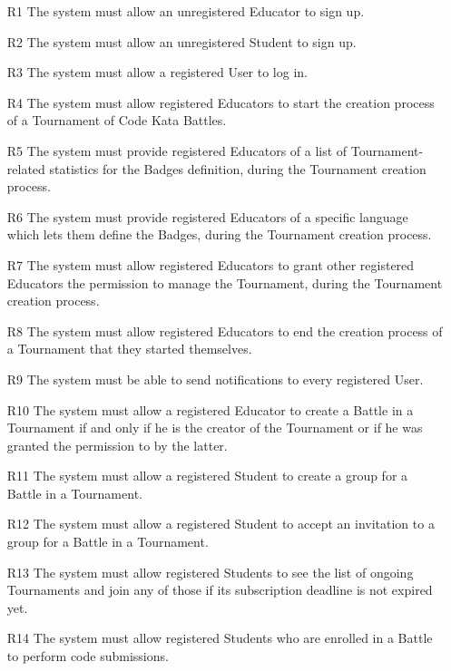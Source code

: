 \documentclass{Configuration_Files/Template}
\begin{document}
\begin{enumerate}
    \item[\textcolor{bluepoli}{R1}] The system must allow an unregistered Educator to sign up.
    \item[\textcolor{bluepoli}{R2}] The system must allow an unregistered Student to sign up.
    \item[\textcolor{bluepoli}{R3}] The system must allow a registered User to log in.
    \item[\textcolor{bluepoli}{R4}] The system must allow registered Educators to start the creation process of a Tournament of Code Kata Battles.
    \item[\textcolor{bluepoli}{R5}] The system must provide registered Educators of a list of Tournament-related statistics for the Badges definition, during the Tournament creation process.
    \item[\textcolor{bluepoli}{R6}] The system must provide registered Educators of a specific language which lets them define the Badges, during the Tournament creation process.
    \item[\textcolor{bluepoli}{R7}] The system must allow registered Educators to grant other registered Educators the permission to manage the Tournament, during the Tournament creation process.
    \item[\textcolor{bluepoli}{R8}] The system must allow registered Educators to end the creation process of a Tournament that they started themselves.
    \item[\textcolor{bluepoli}{R9}] The system must be able to send notifications to every registered User.
    \item[\textcolor{bluepoli}{R10}] The system must allow a registered Educator to create a Battle in a Tournament if and only if he is the creator of the Tournament or if he was granted the permission to by the latter.
    \item[\textcolor{bluepoli}{R11}] The system must allow a registered Student to create a group for a Battle in a Tournament.
    \item[\textcolor{bluepoli}{R12}] The system must allow a registered Student to accept an invitation to a group for a Battle in a Tournament.
    \item[\textcolor{bluepoli}{R13}] The system must allow registered Students to see the list of ongoing Tournaments and join any of those if its subscription deadline is not expired yet.
    \item[\textcolor{bluepoli}{R14}] The system must allow registered Students who are enrolled in a Battle to perform code submissions.

\end{enumerate}
\end{document}
